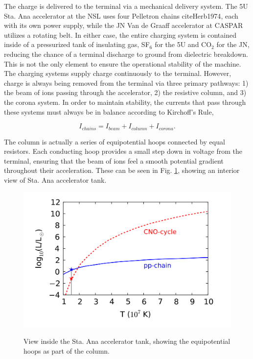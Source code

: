 The charge is delivered to the terminal via a mechanical delivery system. The 5U Sta. Ana accelerator at the NSL uses four Pelletron chains cite{Herb1974}, each with its own power supply, while the JN Van de Graaff accelerator at CASPAR utilizes a rotating belt. In either case, the entire charging system is contained inside of a pressurized tank of insulating gas, SF$_{6}$ for the 5U and CO$_2$ for the JN, reducing the chance of a terminal discharge to ground from dielectric breakdown. This is not the only element to ensure the operational stability of the machine. The charging systems supply charge continuously to the terminal. However, charge is always being removed from the terminal via three primary pathways: 1) the beam of ions passing through the accelerator, 2) the resistive column, and 3) the corona system. In order to maintain stability, the currents that pass through these systems must always be in balance according to Kirchoff's Rule,

\begin{equation}
I_{chains} = I_{beam} + I_{column} + I_{corona}.
\end{equation}

\noindent The column is actually a series of equipotential hoops connected by equal resistors. Each conducting hoop provides a small step down in voltage from the terminal, ensuring that the beam of ions feel a smooth potential gradient throughout their acceleration. These can be seen in Fig. \ref{fig: column}, showing an interior view of Sta. Ana accelerator tank. 


\begin{figure}
\includegraphics[width=\linewidth]{figures/energyProduction.png}
\label{fig: column}
\caption{View inside the Sta. Ana accelerator tank, showing the equipotential hoops as part of the column.}
\end{figure}


